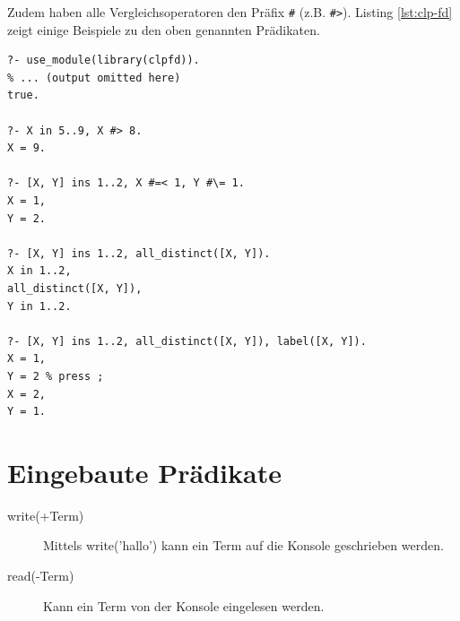 Zudem haben alle Vergleichsoperatoren den Präfix \verb|#| (z.B. \verb|#>|). Listing \ref{lst:clp-fd} zeigt einige Beispiele zu den oben genannten Prädikaten.
\begin{lstlisting}[caption=CLP-FD, label=lst:clp-fd]
?- use_module(library(clpfd)).
% ... (output omitted here)
true.

?- X in 5..9, X #> 8.
X = 9.

?- [X, Y] ins 1..2, X #=< 1, Y #\= 1.
X = 1,
Y = 2.

?- [X, Y] ins 1..2, all_distinct([X, Y]).
X in 1..2,
all_distinct([X, Y]),
Y in 1..2.

?- [X, Y] ins 1..2, all_distinct([X, Y]), label([X, Y]).
X = 1,
Y = 2 % press ;
X = 2,
Y = 1.
\end{lstlisting}

\section{Eingebaute Prädikate}

\begin{description}
	\item[write(+Term)] Mittels write('hallo') kann ein Term auf die Konsole geschrieben werden.
	\item[read(-Term)] Kann ein Term von der Konsole eingelesen werden.
\end{description}